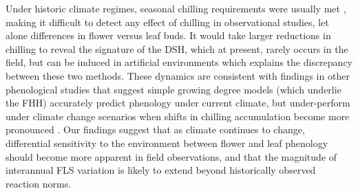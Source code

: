 \documentclass[11pt]{article}\usepackage[]{graphicx}\usepackage[]{color}
\begin{document}
\noindent Under historic climate regimes, seasonal chilling requirements were usually met \citep{Gauzere2019,Chuine:2016aa}, making it difficult to detect any effect of chilling in observational studies, let alone differences in flower versus leaf buds. It would take larger reductions in chilling to reveal the signature of the DSH, which at present, rarely occurs in the field, but can be induced in artificial environments which explains the discrepancy between these two methods. These dynamics are consistent with findings in other phenological studies that suggest simple growing degree models (which underlie the FHH) accurately predict phenology under current climate, but under-perform under climate change scenarios when shifts in chilling accumulation become more pronounced \citep{Linkosalo2008,Chuine:2016aa}. Our findings suggest that as climate continues to change, differential sensitivity to the environment between flower and leaf phenology should become more apparent in field observations, and that the magnitude of interannual FLS variation is likely to extend beyond historically observed reaction norms.\\ 
\end{document}
